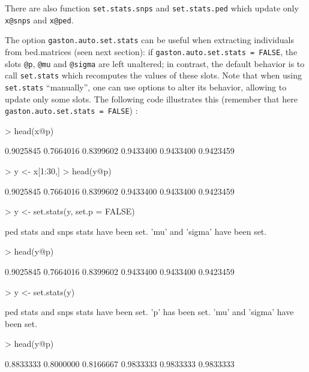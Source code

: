 \documentclass{article}
\renewenvironment{Schunk}{\vspace{\topsep}}{\vspace{\topsep}}
\begin{document}
  There are also function \verb!set.stats.snps! and \verb!set.stats.ped! which
  update only \verb!x@snps! and \verb!x@ped!.

  The option \verb!gaston.auto.set.stats! can be useful when extracting 
  individuals from bed.matrices (seen next section): if
  \verb!gaston.auto.set.stats = FALSE!, the slots \verb!@p!, \verb!@mu! and \verb!@sigma!
  are left unaltered; in contrast, the default behavior is to call \verb!set.stats! 
  which recomputes the values of these slots. 
  Note that when using \verb!set.stats! ``manually'', one can use options to alter its behavior, 
  allowing to update only some slots. The following code illustrates this (remember that here 
  \verb!gaston.auto.set.stats = FALSE!) :

\begin{Schunk}
\begin{Sinput}
> head(x@p)
\end{Sinput}
\begin{Soutput}
[1] 0.9025845 0.7664016 0.8399602 0.9433400 0.9433400 0.9423459
\end{Soutput}
\begin{Sinput}
> y <- x[1:30,]
> head(y@p)
\end{Sinput}
\begin{Soutput}
[1] 0.9025845 0.7664016 0.8399602 0.9433400 0.9433400 0.9423459
\end{Soutput}
\begin{Sinput}
> y <- set.stats(y, set.p = FALSE)
\end{Sinput}
\begin{Soutput}
ped stats and snps stats have been set. 
'mu' and 'sigma' have been set.
\end{Soutput}
\begin{Sinput}
> head(y@p)
\end{Sinput}
\begin{Soutput}
[1] 0.9025845 0.7664016 0.8399602 0.9433400 0.9433400 0.9423459
\end{Soutput}
\begin{Sinput}
> y <- set.stats(y)
\end{Sinput}
\begin{Soutput}
ped stats and snps stats have been set. 
'p' has been set. 
'mu' and 'sigma' have been set.
\end{Soutput}
\begin{Sinput}
> head(y@p)
\end{Sinput}
\begin{Soutput}
[1] 0.8833333 0.8000000 0.8166667 0.9833333 0.9833333 0.9833333
\end{Soutput}
\end{Schunk}
\end{document}
